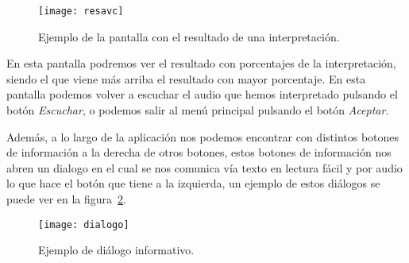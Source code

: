 \begin{figure}[htp]
	\centering
	\texttt{[image: resavc]}
	\caption{Ejemplo de la pantalla con el resultado de una interpretación.}
	\label{fig:resavc}
\end{figure}

En esta pantalla podremos ver el resultado con porcentajes de la interpretación, siendo el que viene más arriba el resultado con mayor porcentaje. En esta pantalla podemos volver a escuchar el audio que hemos interpretado pulsando el botón \textit{Escuchar}, o podemos salir al menú principal pulsando el botón \textit{Aceptar}.

Además, a lo largo de la aplicación nos podemos encontrar con distintos botones de información a la derecha de otros botones, estos botones de información nos abren un dialogo en el cual se nos comunica vía texto en lectura fácil y por audio lo que hace el botón que tiene a la izquierda, un ejemplo de estos diálogos se puede ver en la figura~\ref{fig:diaavc}.

\begin{figure}[htp]
	\centering
	\texttt{[image: dialogo]}
	\caption{Ejemplo de diálogo informativo.}
	\label{fig:diaavc}
\end{figure}